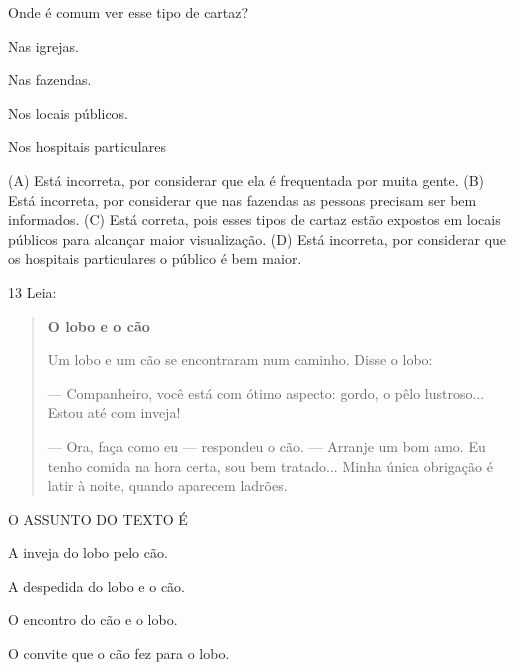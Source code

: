Onde é comum ver esse tipo de cartaz?

\begin{minipage}{.5\textwidth}
\begin{escolha}
\item Nas igrejas.

\item Nas fazendas.

\item Nos locais públicos.

\item Nos hospitais particulares
\end{escolha}
\end{minipage}

(A) Está incorreta, por considerar que ela é frequentada por muita gente.
(B) Está incorreta, por considerar que nas fazendas as pessoas precisam
ser bem informados.
(C) Está correta, pois esses tipos de cartaz estão expostos em locais
públicos para alcançar maior visualização.
(D) Está incorreta, por considerar que os hospitais particulares o
público é bem maior.

\num{13} Leia:


\begin{quote}
\textbf{O lobo e o cão}

Um lobo e um cão se encontraram num caminho. Disse o lobo:

--- Companheiro, você está com ótimo aspecto: gordo, o pêlo lustroso...
Estou até com inveja!

--- Ora, faça como eu --- respondeu o cão. --- Arranje um bom amo.
Eu tenho comida na hora certa, sou bem tratado...
Minha única obrigação é latir à noite, quando aparecem ladrões.
\end{quote}


O ASSUNTO DO TEXTO É

\begin{escolha}
\item A inveja do lobo pelo cão.

\item A despedida do lobo e o cão.

\item O encontro do cão e o lobo.

\item O convite que o cão fez para o lobo.
\end{escolha}


